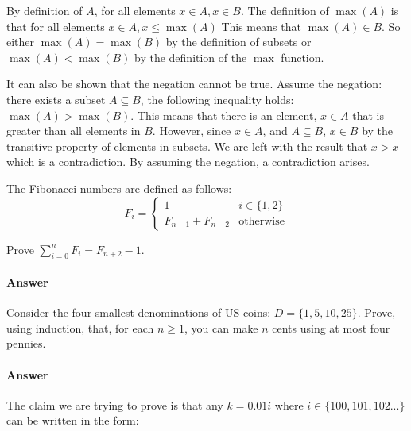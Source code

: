 \documentclass{article}
\begin{document}
By definition of $A$, for all elements $x \in A, x\in B$. The definition of $\max(A)$ is that for all elements $x \in A, x \leq \max(A)$
This means that $\max(A) \in B$. So either $\max(A) = \max(B)$ by the definition of subsets or $ \max(A) < \max(B)$ by the definition of the $\max$ function.

It can also be shown that the negation cannot be true. Assume the negation: there exists a subset  $A \subseteq B$, the following inequality
holds: $\max(A) > \max(B)$. This means that there is an element, $x \in A$ that is greater than all elements in $B$. However, since $x \in A$,
 and $A \subseteq B$, $x \in B$ by the transitive property of elements in subsets. We are left with the result that $x>x$ which is a contradiction. 
 By assuming the negation, a contradiction arises.

\collab{\todo{}} 

The Fibonacci numbers are defined as follows:
$$
    F_i = \begin{cases}
            1 & i \in \{1,2\} \\
            F_{n-1}+F_{n-2} & \text{otherwise}
          \end{cases}
$$

Prove $\sum_{i=0}^n F_i = F_{n+2}-1$.

\paragraph{Answer}


\collab{\todo{}} 

Consider the four smallest denominations of US coins: $D=\{1,5,10,25\}$.  Prove, using
induction, that, for each $n \geq 1$, you can make $n$ cents using at most four
pennies.

\paragraph{Answer}
The claim we are trying to prove is that any $k = 0.01i$ where $i \in \{100, 101, 102...\}$ can be written in the form:
\end{document}
